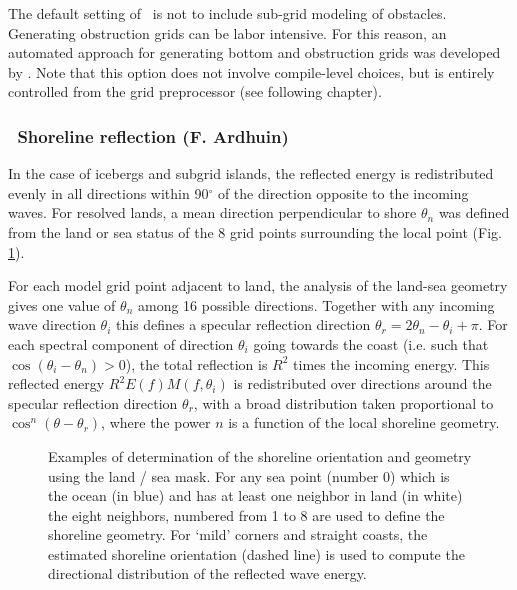The default setting of \ws\ is not to include sub-grid modeling of
obstacles. Generating obstruction grids can be labor intensive. For this
reason, an automated approach for generating bottom and obstruction grids was
developed by \cite{tol:MMAB07a, tol:OMOD08a}.  Note that this option does not
involve compile-level choices, but is entirely controlled from the grid
preprocessor (see following chapter).


\vsssub
\subsubsection{~Shoreline reflection \hfill {\rm (F. Ardhuin)}} \label{sec_refl}
\vsssub
In the case of  icebergs and subgrid islands, the reflected energy is redistributed evenly in all directions within 90$^\circ$ of the direction opposite to 
the incoming waves. 
For resolved lands,  a mean direction perpendicular to shore $\theta_n$ was defined 
from the land or sea status of the 8 grid points surrounding the local point (Fig. \ref{fig:refl}). 

For each model grid point adjacent to land, the analysis of the land-sea geometry gives one value of $\theta_n$  among
16 possible directions. Together with any incoming wave direction $\theta_i$ this defines a specular reflection direction $\theta_r=2 \theta_n - \theta_i + \pi$.  
For each spectral component of direction $\theta_i$ going towards the coast (i.e. such that $\cos(\theta_i-\theta_n) >0$),  the total reflection 
is $R^2$ times the incoming  energy. This reflected energy $R^2 E(f) M(f,\theta_i)$ is redistributed over directions 
around the specular reflection direction $\theta_r$, with a broad distribution taken proportional to $\cos^n(\theta-\theta_r)$, where the power $n$ 
is a function of the local shoreline geometry. 

\begin{figure} \begin{center}
\caption{Examples of determination of the shoreline orientation and geometry using the land / sea mask. For any sea point (number 0) which is the ocean (in blue) 
and has at least one neighbor in land (in white) the eight neighbors, numbered from 1 to 8 are used to define the shoreline geometry. 
For `mild' corners and straight coasts, the estimated shoreline orientation (dashed line) is used to compute the directional distribution of the reflected wave energy.  
}
\label{fig:refl} \botline
\end{center}
\end{figure}

